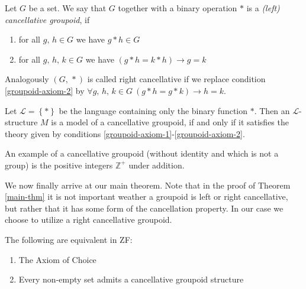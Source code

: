 \documentclass[../../main.tex]{subfiles}
\begin{document}
\begin{definition}[Groupoid]
    Let $G$ be a set.
    We say that $G$ together with a binary operation $*$ is a \emph{(left) cancellative groupoid}, if 
    \begin{enumerate}[label=(\roman*)]
        \item \label{groupoid-axiom-1} for all $g,\, h \in G$ we have $g * h \in G$
        \item \label{groupoid-axiom-2} for all $g,\, h,\, k \in G$ we have $\left(g * h = k * h\right) \rightarrow g = k$
    \end{enumerate}
    Analogously $\left(G,\, *\right)$ is called right cancellative if we replace condition \ref{groupoid-axiom-2} by
    $\forall g,\, h,\, k \in G \ \left(g * h = g * k\right) \rightarrow h = k$.

    Let $\mathcal{L} = \left\{*\right\}$ be the language containing only the binary function $*$.
    Then an $\mathcal{L}$-structure $M$ is a model of a cancellative groupoid, 
    if and only if it satisfies the theory given by conditions \ref{groupoid-axiom-1}-\ref{groupoid-axiom-2}.
\end{definition}
An example of a cancellative groupoid (without identity and which is not a group) is the positive integers $\mathbb{Z}^+$ under addition.

We now finally arrive at our main theorem.
Note that in the proof of Theorem \ref{main-thm} it is not important weather a groupoid is left or right cancellative,
but rather that it has some form of the cancellation property.
In our case we choose to utilize a right cancellative groupoid.

\begin{theorem}\cite{Haj72}\label{main-thm}
    The following are equivalent in ZF:
    \begin{enumerate}
        \item The Axiom of Choice
        \item Every non-empty set admits a cancellative groupoid structure
    \end{enumerate}
\end{theorem}
\end{document}
